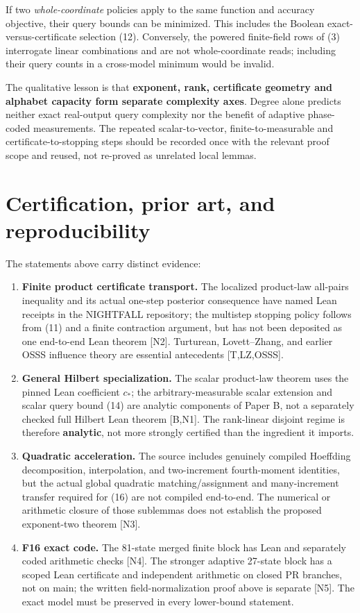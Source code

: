 \documentclass[
  10pt,
]{article}
\providecommand{\tightlist}{%
  \setlength{\itemsep}{0pt}\setlength{\parskip}{0pt}}
\begin{document}
If two \emph{whole-coordinate} policies apply to the same function and
accuracy objective, their query bounds can be minimized. This includes
the Boolean exact-versus-certificate selection (12). Conversely, the
powered finite-field rows of (3) interrogate linear combinations and are
not whole-coordinate reads; including their query counts in a
cross-model minimum would be invalid.

The qualitative lesson is that \textbf{exponent, rank, certificate
geometry and alphabet capacity form separate complexity axes}. Degree
alone predicts neither exact real-output query complexity nor the
benefit of adaptive phase-coded measurements. The repeated
scalar-to-vector, finite-to-measurable and certificate-to-stopping steps
should be recorded once with the relevant proof scope and reused, not
re-proved as unrelated local lemmas.

\section{Certification, prior art, and
reproducibility}\label{certification-prior-art-and-reproducibility}

The statements above carry distinct evidence:

\begin{enumerate}
\def\labelenumi{\arabic{enumi}.}
\tightlist
\item
  \textbf{Finite product certificate transport.} The localized
  product-law all-pairs inequality and its actual one-step posterior
  consequence have named Lean receipts in the NIGHTFALL repository; the
  multistep stopping policy follows from (11) and a finite contraction
  argument, but has not been deposited as one end-to-end Lean theorem
  {[}N2{]}. Turturean, Lovett--Zhang, and earlier OSSS influence theory
  are essential antecedents {[}T,LZ,OSSS{]}.
\item
  \textbf{General Hilbert specialization.} The scalar product-law
  theorem uses the pinned Lean coefficient \(c_*\); the
  arbitrary-measurable scalar extension and scalar query bound (14) are
  analytic components of Paper B, not a separately checked full Hilbert
  Lean theorem {[}B,N1{]}. The rank-linear disjoint regime is therefore
  \textbf{analytic}, not more strongly certified than the ingredient it
  imports.
\item
  \textbf{Quadratic acceleration.} The source includes genuinely
  compiled Hoeffding decomposition, interpolation, and two-increment
  fourth-moment identities, but the actual global quadratic
  matching/assignment and many-increment transfer required for (16) are
  not compiled end-to-end. The numerical or arithmetic closure of those
  sublemmas does not establish the proposed exponent-two theorem
  {[}N3{]}.
\item
  \textbf{F16 exact code.} The 81-state merged finite block has Lean and
  separately coded arithmetic checks {[}N4{]}. The stronger adaptive
  27-state block has a scoped Lean certificate and independent
  arithmetic on closed PR branches, not on main; the written
  field-normalization proof above is separate {[}N5{]}. The exact model
  must be preserved in every lower-bound statement.
\end{enumerate}
\end{document}

